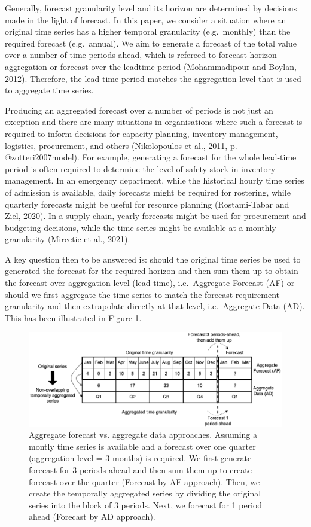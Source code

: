 \documentclass[]{elsarticle} %
\begin{document}
Generally, forecast granularity level and its horizon are determined by
decisions made in the light of forecast. In this paper, we consider a
situation where an original time series has a higher temporal
granularity (e.g.~monthly) than the required forecast (e.g.~annual). We
aim to generate a forecast of the total value over a number of time
periods ahead, which is refereed to forecast horizon aggregation or
forecast over the leadtime period (Mohammadipour and Boylan, 2012).
Therefore, the lead-time period matches the aggregation level that is
used to aggregate time series.

Producing an aggregated forecast over a number of periods is not just an
exception and there are many situations in organisations where such a
forecast is required to inform decisions for capacity planning,
inventory management, logistics, procurement, and others (Nikolopoulos
et al., 2011, p. @zotteri2007model). For example, generating a forecast
for the whole lead-time period is often required to determine the level
of safety stock in inventory management. In an emergency department,
while the historical hourly time series of admission is available, daily
forecasts might be required for rostering, while quarterly forecasts
might be useful for resource planning (Rostami-Tabar and Ziel, 2020). In
a supply chain, yearly forecasts might be used for procurement and
budgeting decisions, while the time series might be available at a
monthly granularity (Mircetic et al., 2021).

A key question then to be answered is: should the original time series
be used to generated the forecast for the required horizon and then sum
them up to obtain the forecast over aggregation level (lead-time),
i.e.~Aggregate Forecast (AF) or should we first aggregate the time
series to match the forecast requirement granularity and then
extrapolate directly at that level, i.e.~Aggregate Data (AD). This has
been illustrated in Figure \ref{fig:example_oanoa}.

\begin{figure}[H]
\includegraphics[width=0.9\linewidth]{img/300dpi/nota} \caption{Aggregate forecast vs. aggregate data approaches. Assuming a montly time series is available and a forecast over one quarter (aggregation level = 3 months) is required. We first generate forecast for 3 periods ahead and then sum them up to create forecast over the quarter (Forecast by AF approach). Then, we create the temporally aggregated series by dividing the original series into the block of 3 periods. Next, we forecast for 1 period ahead (Forecast by AD approach).}\label{fig:example_oanoa}
\end{figure}
\end{document}
